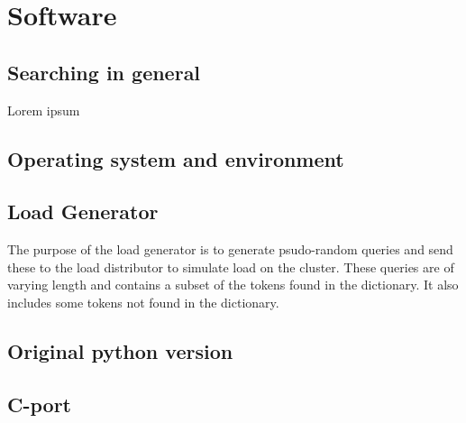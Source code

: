 
\section{Software}
\subsection{Searching in general}
Lorem ipsum\cite{IntroIR}
\subsection{Operating system and environment}
\subsection{Load Generator}
The purpose of the load generator is to generate psudo-random queries and send these to the load distributor to simulate load on the cluster. These queries are of varying length and contains a subset of the tokens found in the dictionary. It also includes some tokens not found in the dictionary. 








\subsection{Original python version}
\subsection{C-port}


